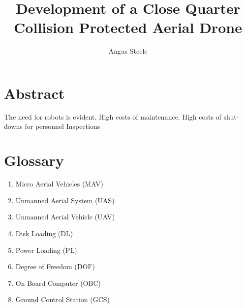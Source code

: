 \documentclass[]{report}
\title{Development of a Close Quarter Collision Protected Aerial Drone}
\author{Angus Steele}
\begin{document}
\maketitle


\chapter*{Abstract}
The need for robots is evident. High costs of maintenance. High costs of shut-downs for personnel Inspections


\tableofcontents
\listoftables


\chapter*{Glossary}
\begin{enumerate}
\item Micro Aerial Vehicles (MAV)
\item Unmanned Aerial System (UAS)
\item Unmanned Aerial Vehicle (UAV)
\item Disk Loading (DL)
\item Power Loading (PL)
\item Degree of Freedom (DOF)

\item On Board Computer (OBC)
\item Ground Control Station (GCS)
\end{enumerate}

\newpage
\end{document}
